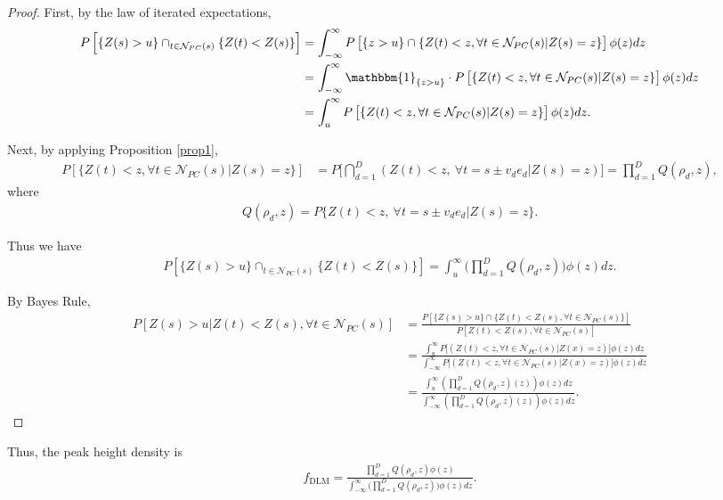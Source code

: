 \documentclass{article}
\begin{document}
\begin{proof}
First, by the law of iterated expectations,
\begin{align*}
P\left[\{Z(s) > u\}\cap_{t\in\mathcal{N}_{PC}(s)}\{Z(t) < Z(s)\}\right]
&=\int_{-\infty}^{\infty}P\left[\{z>u\}\cap\{Z(t)<z, \forall t\in\mathcal{N}_{PC}(s)|Z(s)=z\}\right]\phi(z)dz\\
&=\int_{-\infty}^{\infty}\mathbbm{1}_{\{z>u\}}\cdot P\left[\{Z(t)<z, \forall t\in\mathcal{N}_{PC}(s)|Z(s)=z\}\right]\phi(z)dz\\
&=\int_{u}^{\infty}P\left[\{Z(t)<z, \forall t\in\mathcal{N}_{PC}(s)|Z(s)=z\}\right]\phi(z)dz.
\end{align*}

Next, by applying Proposition \ref{prop1}, 
\begin{align*}
P\left[\{Z(t)<z, \forall t\in\mathcal{N}_{PC}(s)|Z(s)=z\}\right] &= P\bigg[\bigcap_{d=1}^{D}(Z(t)<z,\ \forall t=s\pm v_de_d|Z(s)=z) \bigg]\nonumber = \prod_{d=1}^{D}Q(\rho_d,z),
\end{align*}
where
\begin{align*}
Q(\rho_d,z)=P\{Z(t)<z,\ \forall t=s\pm v_de_d |Z(s)=z\}.
\end{align*}

Thus we have
\begin{align*}
P\left[\{Z(s) > u\}\cap_{t\in\mathcal{N}_{PC}(s)}\{Z(t) < Z(s)\}\right]= \int_u^\infty\bigg(\prod_{d=1}^DQ(\rho_d,z)\bigg)\phi(z)dz.
\end{align*}

By Bayes Rule,
\begin{align*}
P [Z(s) > u|Z(t) < Z(s), \forall t \in \mathcal{N}_{PC}(s)] &= \frac{P[\{Z(s)> u\} \cap \{Z(t) < Z(s), \forall t \in \mathcal{N}_{PC}(s)\}]}{P[Z(t) < Z(s), \forall t \in \mathcal{N}_{PC}(s)]} \\&= \frac{\int_{u}^{\infty}P\big[(Z(t)<z, \forall t \in\mathcal{N}_{PC}(s)|Z(x)=z)\big]\phi(z)dz}{\int_{-\infty}^{\infty}P\big[(Z(t)<z, \forall t\in\mathcal{N}_{PC}(s)|Z(x)=z)\big]\phi(z)dz} \\&=\frac{\int_u^\infty\left(\prod_{d=1}^DQ(\rho_d,z)(z)\right)\phi(z)dz}{\int_{-\infty}^\infty\left(\prod_{d=1}^DQ(\rho_d,z)(z)\right)\phi(z)dz}.
\end{align*}

\end{proof}

Thus, the peak height density is 
\begin{align*}
f_{\text{DLM}} = \frac{\prod_{d=1}^DQ(\rho_d,z)\phi(z)}{\int_{-\infty}^\infty\bigg(\prod_{d=1}^DQ(\rho_d,z)\bigg)\phi(z)dz}.
\end{align*}
\end{document}

